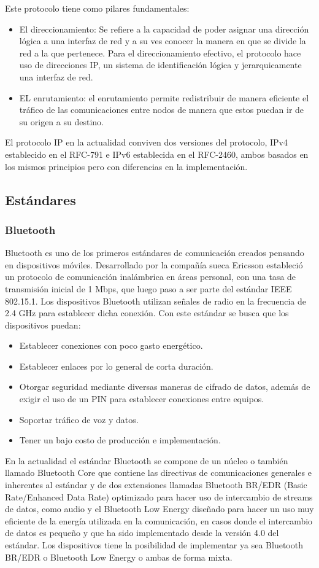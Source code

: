 Este protocolo tiene como pilares fundamentales:
\begin{itemize}
\item El direccionamiento: Se refiere a la capacidad de poder asignar una dirección lógica a una interfaz de red y a su ves conocer  la manera en que se divide la red a la que pertenece.  Para el direccionamiento efectivo, el protocolo hace uso de direcciones IP, un sistema de identificación lógica y jerarquicamente una interfaz de red.
\item EL enrutamiento: el enrutamiento permite redistribuir de manera eficiente el tráfico de las comunicaciones entre nodos de manera que estos puedan ir de su origen a su destino.
\end{itemize}
 
El protocolo IP en la actualidad conviven dos versiones del protocolo, IPv4 establecido en el RFC-791\cite{rfc791} e IPv6 establecida en el RFC-2460\cite{rfc2460}, ambos basados en los mismos principios pero con diferencias en la implementación.

\subsection{Estándares}
\subsubsection{Bluetooth}
Bluetooth es uno de los primeros estándares de comunicación creados pensando en dispositivos móviles. Desarrollado por la compañía sueca Ericsson estableció un protocolo de comunicación inalámbrica en áreas personal, con una tasa de transmisión inicial de 1 Mbps, que luego paso a ser parte del estándar IEEE 802.15.1\cite{ieeebluetooth}. Los dispositivos Bluetooth utilizan señales de radio en la frecuencia de 2.4 GHz para establecer dicha conexión.  Con este estándar se busca que los dispositivos puedan:
\begin{itemize}
\item Establecer conexiones con poco gasto energético.
\item Establecer enlaces por lo general de corta duración.
\item Otorgar seguridad mediante diversas maneras de cifrado de datos, además de exigir el uso de un PIN para establecer conexiones entre equipos.
\item Soportar tráfico de voz y datos.
\item Tener un bajo costo de producción e implementación.
\end{itemize}
En la actualidad el estándar Bluetooth se compone de un núcleo o también llamado Bluetooth Core que contiene las directivas de comunicaciones generales e inherentes al estándar y de dos extensiones llamadas Bluetooth BR/EDR (Basic Rate/Enhanced Data Rate) optimizado para hacer uso de intercambio de streams de datos, como audio y el Bluetooth Low Energy diseñado para hacer un uso muy eficiente de la energía utilizada en la comunicación, en casos donde el intercambio de datos es pequeño y que ha sido implementado desde la versión 4.0 del estándar. Los dispositivos tiene la posibilidad de implementar ya sea Bluetooth BR/EDR o Bluetooth Low Energy o ambas de forma mixta.\\

